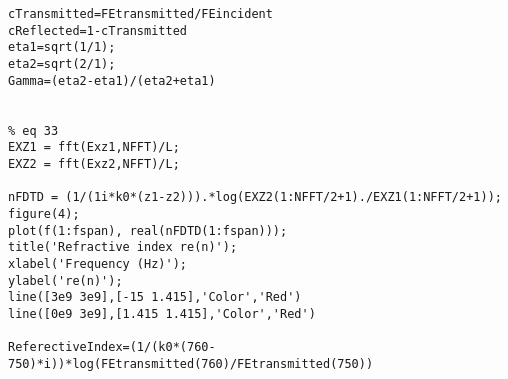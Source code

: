 \begin{lstlisting}
cTransmitted=FEtransmitted/FEincident
cReflected=1-cTransmitted
eta1=sqrt(1/1);
eta2=sqrt(2/1);
Gamma=(eta2-eta1)/(eta2+eta1)


% eq 33
EXZ1 = fft(Exz1,NFFT)/L;
EXZ2 = fft(Exz2,NFFT)/L;

nFDTD = (1/(1i*k0*(z1-z2))).*log(EXZ2(1:NFFT/2+1)./EXZ1(1:NFFT/2+1));
figure(4);
plot(f(1:fspan), real(nFDTD(1:fspan)));
title('Refractive index re(n)');
xlabel('Frequency (Hz)');
ylabel('re(n)');
line([3e9 3e9],[-15 1.415],'Color','Red')
line([0e9 3e9],[1.415 1.415],'Color','Red')

ReferectiveIndex=(1/(k0*(760-750)*i))*log(FEtransmitted(760)/FEtransmitted(750))

\end{lstlisting}

